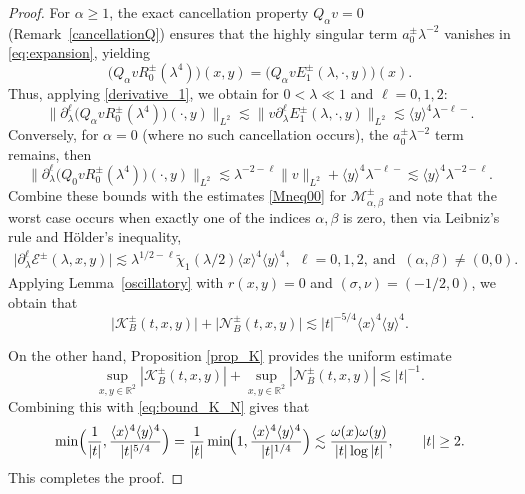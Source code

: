 \documentclass[reqno]{amsart}
\numberwithin{equation}{section}
\begin{document}
\begin{proof}
	For $\alpha \ge 1$, the exact cancellation property $Q_\alpha v = 0$ (Remark~\ref{cancellationQ}) ensures that the highly singular term $a_0^{\pm} \lambda^{-2}$ vanishes in \eqref{eq:expansion}, yielding
	\[
	\bigl( Q_\alpha v R_0^{\pm}(\lambda^4)\bigr)(x,y) = \bigl( Q_\alpha v E_1^{\pm}(\lambda,\cdot,y) \bigr)(x).
	\]
	Thus, applying \eqref{derivative_1}, we obtain for $0 < \lambda \ll 1$ and  $\ell=0,1,2$:
	\[
	\|\partial_\lambda^\ell  \bigl(Q_\alpha v R_0^{\pm}(\lambda^4)\bigr)(\cdot,y)\|_{L^2}
	\lesssim\|v \partial_\lambda^\ell E_1^\pm(\lambda,\cdot,y)\|_{L^2}
	\lesssim \langle y\rangle^4\lambda^{-\ell-}.
	\]
	Conversely, for $\alpha = 0$ (where no such cancellation occurs), the $a_0^{\pm} \lambda^{-2}$ term remains, then
	\[
	\|\partial_\lambda^\ell \bigl(Q_0 v R_0^{\pm}(\lambda^4)\bigr)(\cdot,y)\|_{L^2}
	\lesssim \lambda^{-2-\ell}\|v\|_{L^2} + \langle y\rangle^4\lambda^{-\ell-}
	\lesssim \langle y\rangle^4\lambda^{-2-\ell}.
	\]
	Combine these bounds with the  estimates \eqref{Mneq00} for $\mathcal{M}_{\alpha,\beta}^\pm$ and note that the worst case
	occurs when exactly one of the indices $\alpha,\beta$ is zero, then via Leibniz's rule and H\"{o}lder's inequality,
	\begin{align}\label{eq:estimate_E}
		\bigl| \partial_\lambda^\ell \mathcal{E}^\pm(\lambda,x,y) \bigr|
		\lesssim \lambda^{1/2-\ell}\widetilde{\chi}_1(\lambda/2) \langle x\rangle^{4} \langle y\rangle^{4}, \ \  \ell = 0,1,2, \ \text{and } \ (\alpha,\beta) \neq (0,0).
	\end{align}
Applying Lemma~\ref{oscillatory} with  $r(x,y)=0$ and  $(\sigma,\nu)=(-1/2,0)$, we obtain that
	\begin{equation}\label{eq:bound_K_N}
		\bigl|\mathcal{K}_{B}^\pm(t,x,y)\bigr| + \bigl|\mathcal{N}_{B}^\pm(t,x,y)\bigr| \lesssim |t|^{-5/4}\langle x\rangle^4\langle y\rangle^4.
	\end{equation}
	
	On the other hand, Proposition \ref{prop_K} provides the uniform estimate
	\[
	\sup_{x,y \in \mathbb{R}^2} \left| \mathcal{K}_{B}^\pm(t,x,y) \right|
	+
	\sup_{x,y \in \mathbb{R}^2} \left| \mathcal{N}_{B}^\pm(t,x,y) \right| \lesssim
	|t|^{-1} .
	\]
	Combining this with \eqref{eq:bound_K_N}
	gives that
	\begin{equation}\label{eq:inequality_3}
		\min\Bigl(\frac{1}{|t|},
		\frac{\langle x\rangle^{4}\langle y\rangle^{4}}{|t|^{5/4}}\Bigr)
		=\frac{1}{|t|}\min\!\Bigl(1,
		\frac{\langle x\rangle^{4}\langle y\rangle^{4}}{|t|^{1/4}}\Bigr)
		\lesssim\frac{\omega(x)\omega(y)}{|t|\log|t|}, \qquad |t| \ge 2.
	\end{equation}
	This completes the proof.
\end{proof}
\end{document}
